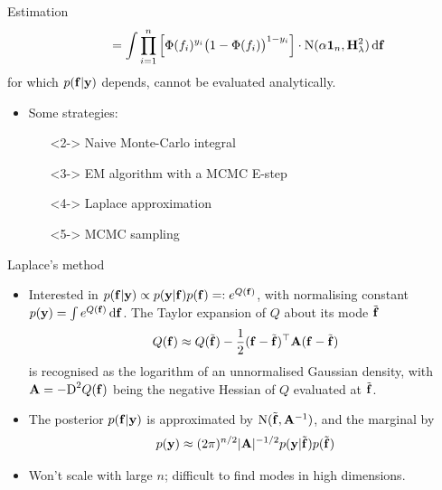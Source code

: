 \begin{frame}{Estimation}
{  \vspace{-5pt}
  \[
    \phantom{p(\by)} = \int \prod_{i=1}^n \left[ \Phi(f_i)^{y_i} \big(1 - \Phi(f_i)\big)^{1-y_i} \right] \cdot \N(\alpha\bone_n, \bH_\lambda^2) \d\bff
  \]
  \hspace{0.65cm} for which $p({\mathbf f}|{\mathbf y})$ depends, cannot be evaluated analytically.}
  \vspace{3pt}
  \begin{itemize}
    \item<2-> Some strategies:
    \begin{itemize}
      \item[\xmark]<2-> Naive Monte-Carlo integral
      \item[\xmark]<3-> EM algorithm with a MCMC E-step
      \item[{\color{FUorange}\cmark}]<4-> Laplace approximation
      \item[{\color{FUorange}\cmark}]<5-> MCMC sampling
    \end{itemize}
  \end{itemize}
\end{frame}


\begin{frame}{Laplace's method}
  \vspace{-15pt}
  \begin{itemize}[<+->]\setlength\itemsep{0.8em}
    \item Interested in $p({\mathbf f}|{\mathbf y}) \propto p({\mathbf y}|{\mathbf f})p({\mathbf f}) =: e^{Q({\mathbf f})}$, with normalising constant $p({\mathbf y}) = \int e^{Q({\mathbf f})} \, \text{d}{\mathbf f}$. The Taylor expansion of $Q$ about its mode $\tilde{{\mathbf f}}$
    \[
      Q({\mathbf f}) \approx Q(\tilde{{\mathbf f}}) - \frac{1}{2} ({\mathbf f} - \tilde{{\mathbf f}})^\top{\mathbf A}({\mathbf f} - \tilde{{\mathbf f}}) 
    \]
    is recognised as the logarithm of an unnormalised Gaussian density, with ${\mathbf A} = -\text{D}^2 Q({\mathbf f})$ being the negative Hessian of $Q$ evaluated at  $\tilde{{\mathbf f}}$.
    \item The posterior $p({\mathbf f}|{\mathbf y})$ is approximated by $\operatorname{N}(\tilde{{\mathbf f}}, {\mathbf A}^{-1})$, and the marginal by
    \[
      p({\mathbf y}) \approx (2\pi)^{n/2} \vert {\mathbf A} \vert^{-1/2}  p({\mathbf y}|\tilde{{\mathbf f}})p(\tilde{{\mathbf f}})
    \]
    \item Won't scale with large $n$; difficult to find modes in high dimensions.
  \end{itemize}
\end{frame}


